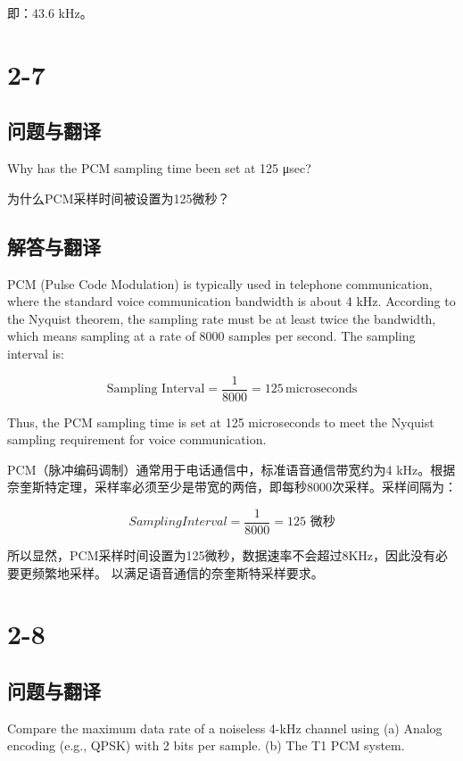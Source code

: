 即：43.6 kHz。


\section{2-7}

\subsection{问题与翻译}

Why has the PCM sampling time been set at 125 μsec?

为什么PCM采样时间被设置为125微秒？

\subsection{解答与翻译}

PCM (Pulse Code Modulation) is typically used in telephone communication, where the standard voice communication bandwidth is about 4 kHz. According to the Nyquist theorem, the sampling rate must be at least twice the bandwidth, which means sampling at a rate of 8000 samples per second. The sampling interval is:

\[
\text{Sampling Interval} = \frac{1}{8000} = 125 \, \text{microseconds}
\]

Thus, the PCM sampling time is set at 125 microseconds to meet the Nyquist sampling requirement for voice communication.

\vspace{10pt}

PCM（脉冲编码调制）通常用于电话通信中，标准语音通信带宽约为4 kHz。根据奈奎斯特定理，采样率必须至少是带宽的两倍，即每秒8000次采样。采样间隔为：

\[
Sampling Interval = \frac{1}{8000} = 125 \text{ 微秒}
\]

所以显然，PCM采样时间设置为125微秒，数据速率不会超过8KHz，因此没有必要更频繁地采样。
以满足语音通信的奈奎斯特采样要求。

\section{2-8}

\subsection{问题与翻译}

Compare the maximum data rate of a noiseless 4-kHz channel using
(a) Analog encoding (e.g., QPSK) with 2 bits per sample.
(b) The T1 PCM system.

